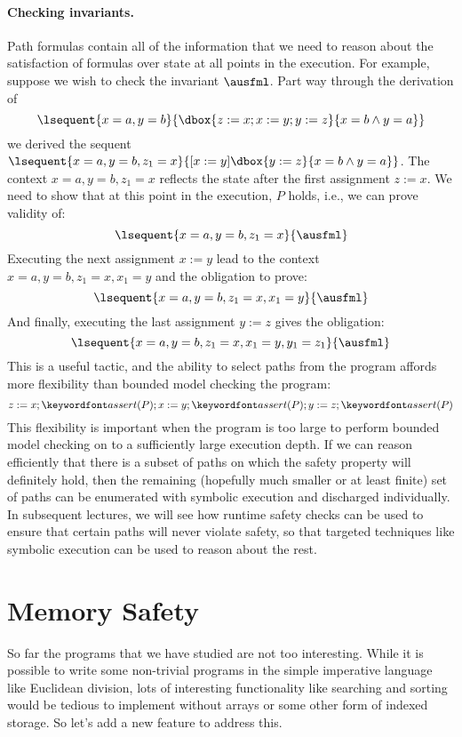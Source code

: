 \documentclass[11pt,twoside]{scrartcl}
\begin{document}
\paragraph{Checking invariants.}
Path formulas contain all of the information that we need to reason about the satisfaction of formulas over state at all points in the execution. For example, suppose we wish to check the invariant $\ausfml$. Part way through the derivation of 
\[
\lsequent{x=a,y=b} {\dbox{z:=x; x:=y; y:=z}{x=b\land y=a}}
\]
we derived the sequent $\lsequent{x=a,y=b,z_1=x}{\dibox{x:=y}\dbox{y:=z}{x=b \land y=a}}$. The context $x=a,y=b,z_1=x$ reflects the state after the first assignment $z:=x$. We need to show that at this point in the execution, $P$ holds, i.e., we can prove validity of:
\[
\lsequent{x=a,y=b,z_1=x}{\ausfml}
\]
Executing the next assignment $x:=y$ lead to the context $x=a,y=b,z_1=x,x_1=y$ and the obligation to prove:
\[
\lsequent{x=a,y=b,z_1=x,x_1=y}{\ausfml}
\]
And finally, executing the last assignment $y:=z$ gives the obligation:
\[
\lsequent{x=a,y=b,z_1=x,x_1=y,y_1=z_1}{\ausfml}
\]
This is a useful tactic, and the ability to select paths from the program affords more flexibility than bounded model checking the program:
\[
z:=x;\passert{P};x:=y;\passert{P};y:=z;\passert{P}
\]
This flexibility is important when the program is too large to perform bounded model checking on to a sufficiently large execution depth. If we can reason efficiently that there is a subset of paths on which the safety property will definitely hold, then the remaining (hopefully much smaller or at least finite) set of paths can be enumerated with symbolic execution and discharged individually. In subsequent lectures, we will see how runtime safety checks can be used to ensure that certain paths will never violate safety, so that targeted techniques like symbolic execution can be used to reason about the rest.

\section{Memory Safety}

So far the programs that we have studied are not too interesting. While it is possible to write some non-trivial programs in the simple imperative language like Euclidean division, lots of interesting functionality like searching and sorting would be tedious to implement without arrays or some other form of indexed storage. So let's add a new feature to address this.
\end{document}
